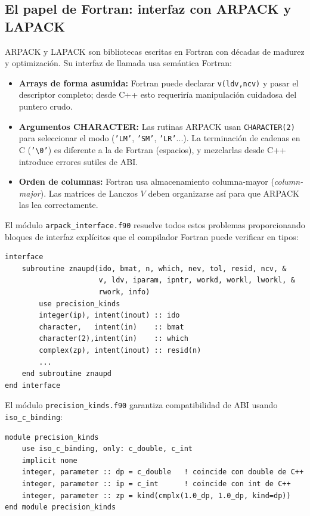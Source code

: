 \documentclass[12pt,a4paper]{article}
\begin{document}
\subsection{El papel de Fortran: interfaz con ARPACK y LAPACK}

ARPACK y LAPACK son bibliotecas escritas en Fortran con décadas de madurez y optimización. Su interfaz de llamada usa semántica Fortran:

\begin{itemize}
    \item \textbf{Arrays de forma asumida:} Fortran puede declarar \texttt{v(ldv,ncv)} y pasar el descriptor completo; desde C++ esto requeriría manipulación cuidadosa del puntero crudo.
    \item \textbf{Argumentos CHARACTER:} Las rutinas ARPACK usan \texttt{CHARACTER(2)} para seleccionar el modo (\texttt{'LM'}, \texttt{'SM'}, \texttt{'LR'}...). La terminación de cadenas en C (\texttt{'\textbackslash 0'}) es diferente a la de Fortran (espacios), y mezclarlas desde C++ introduce errores sutiles de ABI.
    \item \textbf{Orden de columnas:} Fortran usa almacenamiento columna-mayor (\textit{column-major}). Las matrices de Lanczos $V$ deben organizarse así para que ARPACK las lea correctamente.
\end{itemize}

El módulo \texttt{arpack\_interface.f90} resuelve todos estos problemas proporcionando bloques de interfaz explícitos que el compilador Fortran puede verificar en tipos:

\begin{lstlisting}[language=Fortran90, caption={Fragmento de arpack\_interface.f90}]
interface
    subroutine znaupd(ido, bmat, n, which, nev, tol, resid, ncv, &
                      v, ldv, iparam, ipntr, workd, workl, lworkl, &
                      rwork, info)
        use precision_kinds
        integer(ip), intent(inout) :: ido
        character,   intent(in)    :: bmat
        character(2),intent(in)    :: which
        complex(zp), intent(inout) :: resid(n)
        ...
    end subroutine znaupd
end interface
\end{lstlisting}

El módulo \texttt{precision\_kinds.f90} garantiza compatibilidad de ABI usando \texttt{iso\_c\_binding}:

\begin{lstlisting}[language=Fortran90, caption={precision\_kinds.f90 — compatibilidad de tipos C/Fortran}]
module precision_kinds
    use iso_c_binding, only: c_double, c_int
    implicit none
    integer, parameter :: dp = c_double   ! coincide con double de C++
    integer, parameter :: ip = c_int      ! coincide con int de C++
    integer, parameter :: zp = kind(cmplx(1.0_dp, 1.0_dp, kind=dp))
end module precision_kinds
\end{lstlisting}
\end{document}
